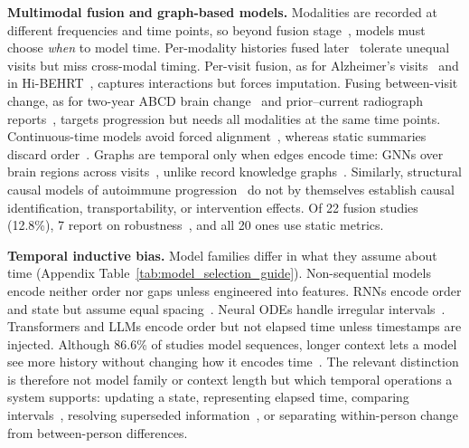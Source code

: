 \documentclass[11pt]{article}
\theoremstyle{plain}
\theoremstyle{definition}
\theoremstyle{remark}
\begin{document}
\noindent\textbf{Multimodal fusion and graph-based models.} Modalities are recorded at different frequencies and time points, so beyond fusion stage~\citep{xu2024comprehensive}, models must choose \emph{when} to model time. Per-modality histories fused later~\citep{lee2019mildint} tolerate unequal visits but miss cross-modal timing. Per-visit fusion, as for Alzheimer's visits~\citep{8834556} and in Hi-BEHRT~\citep{li2022hi}, captures interactions but forces imputation. Fusing between-visit change, as for two-year ABCD brain change~\citep{10313489} and prior--current radiograph reports~\citep{serra-etal-2023-controllable,10943948}, targets progression but needs all modalities at the same time points. Continuous-time models avoid forced alignment~\citep{9338417}, whereas static summaries discard order~\citep{soenksen2022integrated}. Graphs are temporal only when edges encode time: GNNs over brain regions across visits~\citep{9669504}, unlike record knowledge graphs~\citep{9679113}. Similarly, structural causal models of autoimmune progression~\citep{11124198} do not by themselves establish causal identification, transportability, or intervention effects. Of 22 fusion studies (12.8\%), 7 report on robustness~\citep{10385940,10890535,9711166}, and all 20  ones use static metrics.

\noindent\textbf{Temporal inductive bias.} Model families differ in what they assume about time (Appendix Table~\ref{tab:model_selection_guide}). Non-sequential models encode neither order nor gaps unless engineered into features. RNNs encode order and state but assume equal spacing~\citep{perveen2020handling}. Neural ODEs handle irregular intervals~\citep{9338417}. Transformers and LLMs encode order but not elapsed time unless timestamps are injected. Although 86.6\% of studies model sequences, longer context lets a model see more history without changing how it encodes time~\citep{9474774}. The relevant distinction is therefore not model family or context length but which temporal operations a system supports: updating a state, representing elapsed time, comparing intervals~\citep{cho-etal-2026-mi}, resolving superseded information~\citep{zhao-etal-2026-beyond-retrieval}, or separating within-person change from between-person differences.
\end{document}
